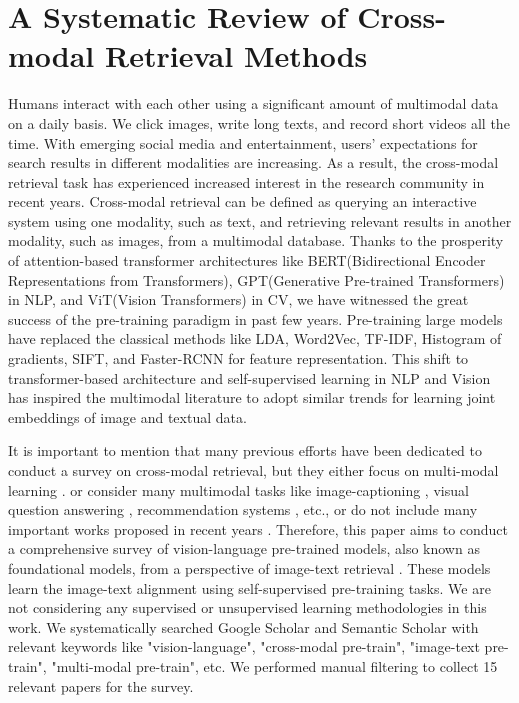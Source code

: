 \section{A Systematic Review of Cross-modal Retrieval Methods}

Humans interact with each other using a significant amount of multimodal data on a daily basis. We click images, write long texts, and record short videos all the time. With emerging social media and entertainment, users' expectations for search results in different modalities are increasing. As a result, the cross-modal retrieval task has experienced increased interest in the research community in recent years. Cross-modal retrieval can be defined as querying an interactive system using one modality, such as text, and retrieving relevant results in another modality, such as images, from a multimodal database. Thanks to the prosperity of attention-based transformer architectures like BERT(Bidirectional Encoder Representations from Transformers), GPT(Generative Pre-trained Transformers) in NLP, and ViT(Vision Transformers) in CV, we have witnessed the great success of the pre-training paradigm in past few years. Pre-training large models have replaced the classical methods like LDA, Word2Vec, TF-IDF, Histogram of gradients, SIFT, and Faster-RCNN for feature representation. This shift to transformer-based architecture and self-supervised learning in NLP and Vision has inspired the multimodal literature to adopt similar trends for learning joint embeddings of image and textual data.

It is important to mention that many previous efforts have been dedicated to conduct a survey on cross-modal retrieval, but they either focus on multi-modal learning \cite{multi}. or consider many multimodal tasks \cite{xu2023multimodal} like image-captioning \cite{vinyals2015tell}, visual question answering \cite{VQA}, recommendation systems \cite{recsys}, etc., or do not include many important works proposed in recent years \cite{cao}. Therefore, this paper aims to conduct a comprehensive survey of vision-language pre-trained models, also known as foundational models, from a perspective of image-text retrieval \cite{flickr8k}. These models learn the image-text alignment using self-supervised pre-training tasks. We are not considering any supervised or unsupervised learning methodologies in this work. We systematically searched Google Scholar and Semantic Scholar with relevant keywords like "vision-language", "cross-modal pre-train", "image-text pre-train", "multi-modal pre-train", etc. We performed manual filtering to collect 15 relevant papers for the survey.

